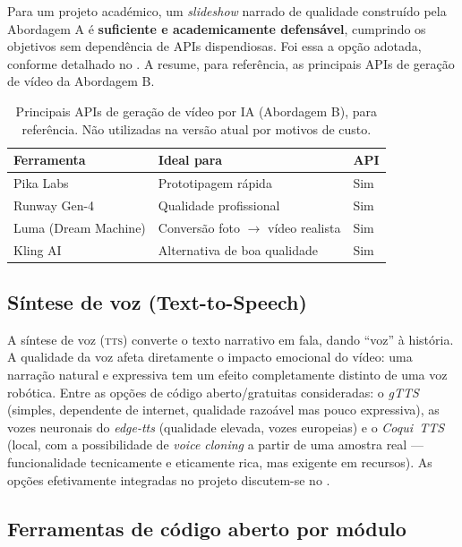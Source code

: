 Para um projeto académico, um \emph{slideshow} narrado de qualidade
construído pela Abordagem A é \textbf{suficiente e academicamente
defensável}, cumprindo os objetivos sem dependência de APIs dispendiosas.
Foi essa a opção adotada, conforme detalhado no .
A  resume, para referência, as principais APIs de
geração de vídeo da Abordagem B.

\begin{table}[H]
\centering
\caption{Principais APIs de geração de vídeo por IA (Abordagem B), para
referência. Não utilizadas na versão atual por motivos de custo.}
\label{tab:videoapis}
\small
\begin{tabularx}{\linewidth}{@{}lYl@{}}
\toprule
\textbf{Ferramenta} & \textbf{Ideal para} & \textbf{API} \\
\midrule
Pika Labs            & Prototipagem rápida                  & Sim \\
Runway Gen-4         & Qualidade profissional               & Sim \\
Luma (Dream Machine) & Conversão foto $\rightarrow$ vídeo realista & Sim \\
Kling AI             & Alternativa de boa qualidade         & Sim \\
\bottomrule
\end{tabularx}
\end{table}

\subsection{Síntese de voz (Text-to-Speech)}
\label{sub:tts}

A síntese de voz (\textsc{tts}) converte o texto narrativo em fala,
dando ``voz'' à história. A qualidade da voz afeta diretamente o impacto
emocional do vídeo: uma narração natural e expressiva tem um efeito
completamente distinto de uma voz robótica. Entre as opções de código
aberto/gratuitas consideradas: o \emph{gTTS} (simples, dependente de
internet, qualidade razoável mas pouco expressiva), as vozes neuronais do
\emph{edge-tts} (qualidade elevada, vozes europeias) e o \emph{Coqui~TTS}
(local, com a possibilidade de \emph{voice cloning} a partir de uma
amostra real — funcionalidade tecnicamente e eticamente rica, mas
exigente em recursos). As opções efetivamente integradas no projeto
discutem-se no .

\subsection{Ferramentas de código aberto por módulo}
\label{sub:ferramentas}

